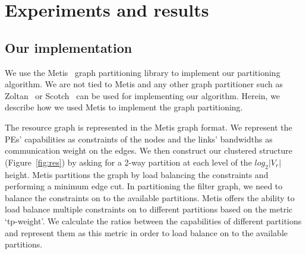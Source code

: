 \section{Experiments and results}
\label{sec:experiments-results}



\subsection{Our implementation}
\label{sec:our-implementation}

We use the Metis~\cite{gkar95} graph partitioning library to implement
our partitioning algorithm. We are not tied to Metis and any other graph
partitioner such as Zoltan~\cite{kdev09} or Scotch~\cite{cche08} can be
used for implementing our algorithm. Herein, we describe how we used
Metis to implement the graph partitioning.

The resource graph is represented in the Metis graph format. We
represent the PEs' capabilities as constraints of the nodes and the
links' bandwidths as communication weight on the edges. We then
construct our clustered structure (Figure~\ref{fig:res}) by asking for a
2-way partition at each level of the $log_2|V_r|$ height. Metis
partitions the graph by load balancing the constraints and performing a
minimum edge cut.  In partitioning the filter graph, we need to balance
the constraints on to the available partitions. Metis offers the ability
to load balance multiple constraints on to different partitions based on
the metric \mbox{`tp-weight'}. We calculate the ratios between the
capabilities of different partitions and represent them as this metric
in order to load balance on to the available partitions.

